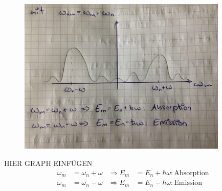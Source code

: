 		\begin{figure} [tbp]
			\begin{center}
				\includegraphics[width=10cm]{Ersatzgraph3.jpg}
			\end{center}
		\end{figure}
	HIER GRAPH EINFÜGEN
	\FloatBarrier
		\begin{align*}
			\omega_m &= \omega_n + \omega &\Rightarrow E_m &= E_n + \hbar \omega: \text{Absorption} \\
			\omega_m &= \omega_n - \omega &\Rightarrow E_m &= E_n - \hbar \omega: \text{Emission}
		\end{align*}
	\nopagebreak